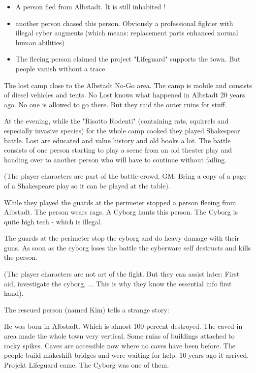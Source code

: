 \begin{itemize}
    \item A person fled from Albstadt. It is still inhabited !
    \item another person chased this person. Obviously a professional fighter with illegal cyber augments (which means: replacement parts enhanced normal human abilities)
    \item The fleeing person claimed the project "Lifeguard" supports the town. But people vanish without a trace
\end{itemize}

The lost camp close to the Albstadt No-Go area. The camp is mobile and consists of diesel vehicles and tents. No Lost knows what happened in Albstadt 20 years ago. No one is allowed to go there. But they raid the outer ruins for stuff.

At the evening, while the "Risotto Rodenti" (containing rats, squirrels and especially invasive species) for the whole camp cooked they played Shakespear battle. Lost are educated and value history and old books a lot. The battle consists of one person starting to play a scene from an old theater play and handing over to another person who will have to continue without failing.

(The player characters are part of the battle-crowd. GM: Bring a copy of a page of a Shakespeare play so it can be played at the table).

While they played the guards at the perimeter stopped a person fleeing from Albstadt. The person wears rags. A Cyborg hunts this person. The Cyborg is quite high tech - which is illegal.

The guards at the perimeter stop the cyborg and do heavy damage with their guns. As soon as the cyborg loses the battle the cyberware self destructs and kills the person.

(The player characters are not art of the fight. But they can assist later: First aid, investigate the cyborg, ... This is why they know the essential info first hand).

The rescued person (named Kim) tells a strange story:

He was born in Albstadt. Which is almost 100 percent destroyed. The caved in area made the whole town very vertical. Some ruins of buildings attached to rocky spikes. Caves are accessible now where no caves have been before. The people build makeshift bridges and were waiting for help. 10 years ago it arrived. Projekt Lifeguard came. The Cyborg was one of them.

